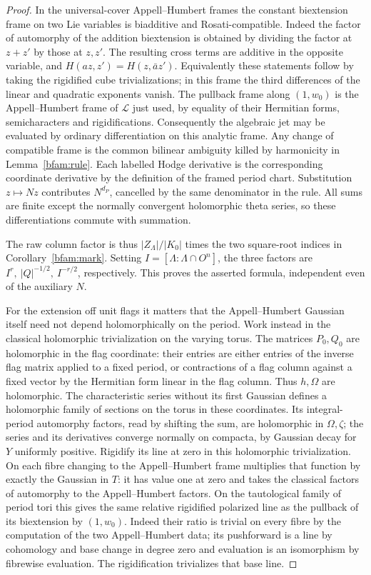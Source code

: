 \begin{proof}
In the universal-cover Appell--Humbert frames the constant
biextension frame on two Lie variables is biadditive and
Rosati-compatible. Indeed the factor of automorphy of the
addition biextension is obtained by dividing the factor at
\(z+z'\) by those at \(z,z'\). The resulting cross terms are
additive in the opposite variable, and
\(H(az,z')=H(z,\bar a z')\). Equivalently these statements follow
by taking the rigidified cube trivializations; in this frame the
third differences of the linear and quadratic exponents vanish.
The pullback frame along \((1,w_0)\) is the
Appell--Humbert frame of \(\mathcal L\) just used, by equality
of their Hermitian forms, semicharacters and rigidifications.
Consequently the algebraic jet may be evaluated by ordinary
differentiation on this analytic frame. Any change of compatible
frame is the common bilinear ambiguity killed by harmonicity
in Lemma~\ref{bfam:rule}. Each labelled Hodge derivative is
the corresponding coordinate derivative by the definition of the
framed period chart. Substitution \(z\mapsto Nz\) contributes
\(N^{d_P}\), cancelled by the same denominator in the rule.
All sums are finite except the normally convergent holomorphic
theta series, so these differentiations commute with summation.

The raw column factor is thus \(|Z_\Lambda|/|K_0|\) times the
two square-root indices in Corollary~\ref{bfam:mark}. Setting
\(I=[\Lambda:\Lambda\cap O^n]\), the three factors are
\(I^r,\ |Q|^{-1/2},\ I^{-r/2}\), respectively. This proves
the asserted formula, independent even of the auxiliary \(N\).

For the extension off unit flags it matters that the
Appell--Humbert Gaussian itself need not depend holomorphically
on the period. Work instead in the classical holomorphic
trivialization on the varying torus. The matrices \(P_0,Q_0\)
are holomorphic in the flag coordinate: their entries are either
entries of the inverse flag matrix applied to a fixed period,
or contractions of a flag column against a fixed vector by the
Hermitian form linear in the flag column. Thus \(h,\Omega\) are
holomorphic. The characteristic series without its first Gaussian
defines a holomorphic family of sections on the torus in these
coordinates. Its integral-period automorphy factors, read by
shifting the sum, are holomorphic in \(\Omega,\zeta\); the series
and its derivatives converge normally on compacta, by Gaussian
decay for \(Y\) uniformly positive. Rigidify its line at zero
in this holomorphic trivialization. On each fibre changing to the
Appell--Humbert frame multiplies that function by exactly the
Gaussian in \(T\): it has value one at zero and takes the
classical factors of automorphy to the Appell--Humbert factors.
On the tautological family of period tori this gives the same
relative rigidified polarized line as the pullback of its
biextension by \((1,w_0)\). Indeed their ratio is trivial on
every fibre by the computation of the two Appell--Humbert data;
its
pushforward is a line by cohomology and base change in degree
zero and evaluation is an isomorphism by fibrewise evaluation.
The rigidification trivializes that base line.


\end{proof}
